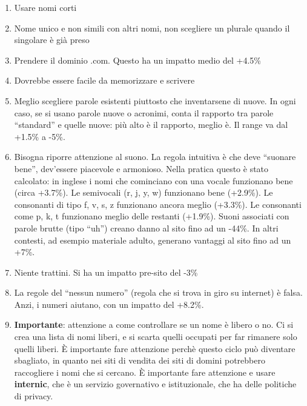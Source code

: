 \begin{enumerate}

\item Usare nomi corti
\item Nome unico e non simili con altri nomi, non scegliere un plurale quando il singolare \`e gi\`a preso
\item Prendere il dominio .com. Questo ha un impatto medio del +4.5\%
\item Dovrebbe essere facile da memorizzare e scrivere
\item Meglio scegliere parole esistenti piuttosto che inventarsene di nuove. In ogni caso, se si usano parole nuove o acronimi, conta il rapporto tra parole ``standard'' e quelle nuove: pi\`u alto \`e il rapporto, meglio \`e. Il range va dal +1.5\% a -5\%.
\item Bisogna riporre attenzione al suono. La regola intuitiva \`e che deve ``suonare bene'', dev'essere piacevole e armonioso. Nella pratica questo \`e stato calcolato: in inglese i nomi che cominciano con una vocale funzionano bene (circa +3.7\%). Le semivocali (r, j, y, w) funzionano bene (+2.9\%). Le consonanti di tipo f, v, s, z funzionano ancora meglio (+3.3\%). Le consonanti come p, k, t funzionano meglio delle restanti (+1.9\%). Suoni associati con parole brutte (tipo ``uh'') creano danno al sito fino ad un -44\%. In altri contesti, ad esempio materiale adulto, generano vantaggi al sito fino ad un +7\%.
\item Niente trattini. Si ha un impatto pre-sito del -3\%
\item La regole del ``nessun numero'' (regola che si trova in giro su internet) \`e falsa. Anzi, i numeri aiutano, con un impatto del +8.2\%.
\item \textbf{Importante}: attenzione a come controllare se un nome \`e libero o no. Ci si crea una lista di nomi liberi, e si scarta quelli occupati per far rimanere solo quelli liberi. \`E importante fare attenzione perch\`e questo ciclo pu\`o diventare sbagliato, in quanto nei siti di vendita dei siti di domini potrebbero raccogliere i nomi che si cercano. \`E importante fare attenzione e usare \textbf{internic}, che \`e un servizio governativo e istituzionale, che ha delle politiche di privacy.

\end{enumerate}
